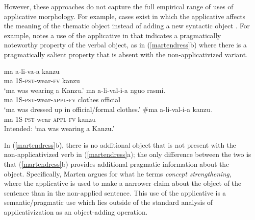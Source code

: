 \documentclass[output=paper]{langsci/langscibook}
\begin{document}
However, these approaches do not capture the full empirical range of uses of applicative morphology. For example, cases exist in which the applicative affects the meaning of the thematic object instead of adding a new syntactic object \citep{Marten2003, creissels:2004, CannMabugu2007, bond:2009}. For example, \citet{Marten2003} notes a use of the applicative in  that indicates a pragmatically noteworthy property of the verbal object, as in (\ref{martendress}b) where there is a pragmatically salient property that is absent with the non-applicativized variant.

\begin{exe}
\ex\label{martendress} \begin{xlist}
	\ex \gll {}ma a-li-va-a kanzu\\
ma 1S-{\scshape pst}-wear-{\scshape fv} kanzu\\
	\glt `ma was wearing a Kanzu.'
	\ex\gll {}ma a-li-val-i-a nguo rasmi.\\
ma {\scshape 1S-pst}-wear-{\scshape appl-fv} clothes official\\
	\glt `ma was dressed up in official/formal clothes.'
	\ex\gll \#ma a-li-val-i-a kanzu.\\
ma {\scshape 1S-pst}-wear-{\scshape appl-fv} kanzu\\
	\glt Intended: `ma was wearing a Kanzu.' \citep[9]{Marten2003} %
	\end{xlist}
\end{exe}
%
In (\ref{martendress}b), there is no additional object that is not present with the non-applicativized verb in (\ref{martendress}a); the only difference between the two is that (\ref{martendress}b) provides additional pragmatic information about the object. Specifically, Marten argues for what he terms \emph{concept strengthening}, where the applicative is used to make a narrower claim about the object of the sentence than in the non-applied sentence. This use of the applicative is a semantic/pragmatic use which lies outside of the standard analysis of applicativization as an object-adding operation. 
\end{document}
